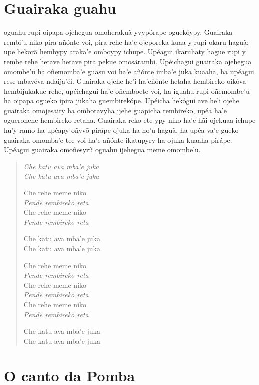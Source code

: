 \chapter{Guairaka guahu}

 oguahu rupi oipapa ojehegua omoherakuã yvypórape oguekóypy.
Guairaka rembi'u niko pira añónte voi, pira rehe ha'e ojeporeka kuaa y
rupi okaru haguã; upe hekorã hembypy araka'e omboypy ichupe. Upéagui
ikaruhaty hague rupi y rembe rehe hetave hetave pira pekue omosãrambi.
Upéichagui guairaka ojehegua omombe'u ha oñemomba'e guasu voi ha'e
añónte imba'e juka kuaaha, ha upéagui rese mbavéva ndaija'éi. Guairaka
ojehe he'i ha'eñónte hetaha hembireko oikóva hembijukakue rehe,
upéichagui ha'e oñemboete voi, ha iguahu rupi oñemombe'u ha oipapa
ogueko ipira jukaha guembirekópe. Upéicha hekógui ave he'i ojehe
guairaka omojesaity ha ombotavyha ijehe guapicha rembireko, upéa ha'e
oguerohehe hembireko retaha. Guairaka reko ete ypy niko ha'e hãi ojekuaa
ichupe hu'y ramo ha upéapy oñyvõ pirápe ojuka ha ho'u haguã, ha upéa
va'e gueko guairaka omomba'e tee voi ha'e añónte ikatupyry ha ojuka
kuaaha pirápe. Upéagui guairaka omoñesyrũ oguahu ijehegua meme omombe'u.

\begin{verse}
\itshape
Che katu ava mba'e juka\\
Che katu ava mba'e juka
       
Che rehe meme niko\\
\emph{Pende rembireko reta}\\
Che rehe meme niko\\
\emph{Pende rembireko reta}
       
Che katu ava mba'e juka\\
Che katu ava mba'e juka          
       
Che rehe meme niko\\
\emph{Pende rembireko reta}\\
Che rehe meme niko\\
\emph{Pende rembireko reta}\\
Che rehe meme niko\\
\emph{Pende rembireko reta}
       
Che katu ava mba'e juka\\
Che katu ava mba'e juka
\end{verse}

\chapter{O canto da Pomba}

